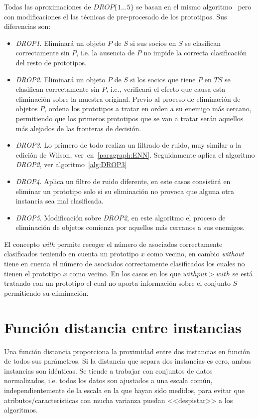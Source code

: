 Todas las aproximaciones de $DROP\lbrace 1\dots5\rbrace$ se basan en el mismo algoritmo~\cite{wilson2000reduction} pero con modificaciones el las técnicas de pre-procesado de los prototipos. Sus diferencias son:
\begin{itemize}
\item \textit{DROP1}. Eliminará un objeto $P$ de $S$ si sus socios en $S$ se clasifican correctamente sin $P$, i.e. la ausencia de $P$ no impide la correcta clasificación del resto de prototipos.
\item \textit{DROP2}. Eliminará un objeto $P$ de $S$ si los socios que tiene $P$ en $TS$ se clasifican correctamente sin $P$, i.e., verificará el efecto que causa esta eliminación sobre la muestra original. Previo al proceso de eliminación de objetos $P$, ordena los prototipos a tratar en orden a su enemigo más cercano, permitiendo que los primeros prototipos que se van a tratar serán aquellos más alejados de las fronteras de decisión.
\item \textit{DROP3}. Lo primero de todo realiza un filtrado de ruido, muy similar a la edición de Wilson, ver~en~\ref{paragraph:ENN}. Seguidamente aplica el algoritmo \textit{DROP2}, ver algoritmo~\ref{alg:DROP3}
\item \textit{DROP4}. Aplica un filtro de ruido diferente, en este casos consistirá en eliminar un prototipo solo si su eliminación no provoca que alguna otra instancia sea mal clasificada.
\item \textit{DROP5}. Modificación sobre \textit{DROP2}, en este algoritmo el proceso de eliminación de objetos comienza por aquellos más cercanos a sus enemigos. 
\end{itemize}

El concepto \textit{with} permite recoger el número de asociados correctamente clasificados teniendo en cuenta un prototipo $x$ como vecino, en cambio \textit{without} tiene en cuenta el número de asociados correctamente clasificados los cuales no tienen el prototipo $x$ como vecino. En los casos en los que $withput > with$ se está tratando con un prototipo el cual no aporta información sobre el conjunto $S$ permitiendo su eliminación.



\vfill
\section{Función distancia entre instancias}
Una función distancia proporciona la proximidad entre dos instancias en función de todos sus parámetros. Si la distancia que separa dos instancias es cero, ambas instancias son idénticas. Se tiende a trabajar con conjuntos de datos normalizados, i.e. todos los datos son ajustados a una escala común, independientemente de la escala en la que hayan sido medidos, para evitar que atributos/características con mucha varianza puedan <<despistar>> a los algoritmos.

